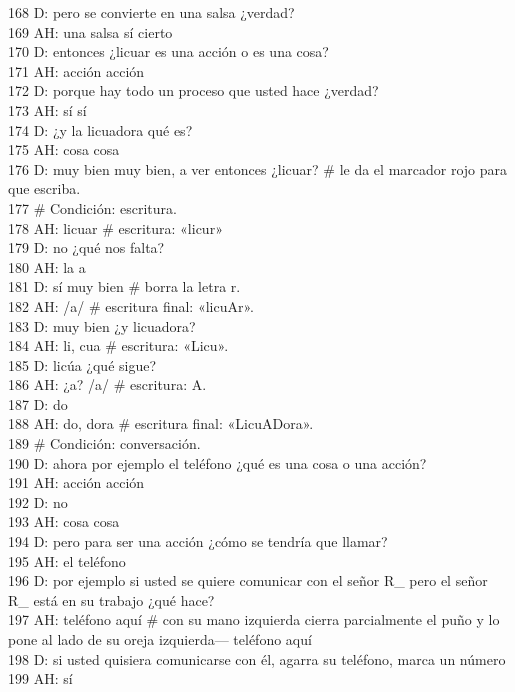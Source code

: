 168 D: pero se convierte en una salsa ¿verdad?\\
169 AH: una salsa sí cierto\\
170 D: entonces ¿licuar es una acción o es una cosa?\\
171 AH: acción acción\\
172 D: porque hay todo un proceso que usted hace ¿verdad?\\
173 AH: sí sí\\
174 D: ¿y la licuadora qué es?\\
175 AH: cosa cosa\\
176 D: muy bien muy bien, a ver entonces ¿licuar? \# le da el marcador rojo para que escriba.\\
177 \# Condición: escritura.\\
178 AH: licuar \# escritura: «licur»\\
179 D: no ¿qué nos falta?\\
180 AH: la a\\
181 D: sí muy bien \# borra la letra r.\\
182 AH: /a/ \# escritura final: «licuAr».\\
183 D: muy bien ¿y licuadora?\\
184 AH: li, cua \# escritura: «Licu».\\
185 D: licúa ¿qué sigue?\\
186 AH: ¿a? /a/ \# escritura: A.\\
187 D: do\\
188 AH: do, dora \# escritura final: «LicuADora».\\
189 \# Condición: conversación.\\
190 D: ahora por ejemplo el teléfono ¿qué es una cosa o una acción?\\
191 AH: acción acción\\
192 D: no\\
193 AH: cosa cosa\\
194 D: pero para ser una acción ¿cómo se tendría que llamar?\\
195 AH: el teléfono\\
196 D: por ejemplo si usted se quiere comunicar con el señor R\_ pero el señor R\_ está en su trabajo ¿qué hace?\\
197 AH: teléfono aquí \# con su mano izquierda cierra parcialmente el puño y lo pone al lado de su oreja izquierda--- teléfono aquí\\
198 D: si usted quisiera comunicarse con él, agarra su teléfono, marca un número\\
199 AH: sí\\
